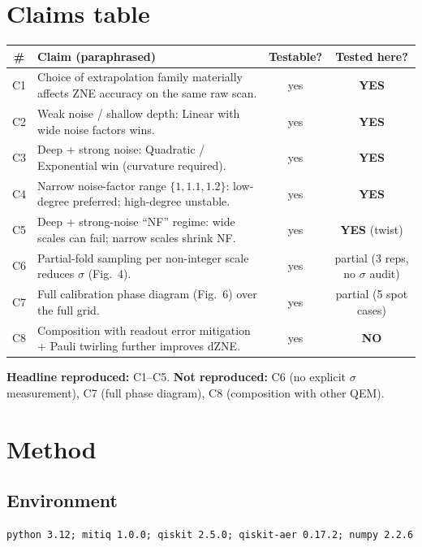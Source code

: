\documentclass[11pt]{article}
\begin{document}
\section{Claims table}
\begin{center}
\begin{tabular}{@{}clcc@{}}
\toprule
\# & Claim (paraphrased) & Testable? & Tested here? \\
\midrule
C1 & Choice of extrapolation family materially affects ZNE accuracy on the same raw scan. & yes & \textbf{YES} \\
C2 & Weak noise / shallow depth: Linear with wide noise factors wins. & yes & \textbf{YES} \\
C3 & Deep + strong noise: Quadratic / Exponential win (curvature required). & yes & \textbf{YES} \\
C4 & Narrow noise-factor range $\{1, 1.1, 1.2\}$: low-degree preferred; high-degree unstable. & yes & \textbf{YES} \\
C5 & Deep + strong-noise ``NF'' regime: wide scales can fail; narrow scales shrink NF. & yes & \textbf{YES} (twist) \\
C6 & Partial-fold sampling per non-integer scale reduces $\sigma$ (Fig.~4). & yes & partial (3 reps, no $\sigma$ audit) \\
C7 & Full calibration phase diagram (Fig.~6) over the full grid. & yes & partial (5 spot cases) \\
C8 & Composition with readout error mitigation + Pauli twirling further improves dZNE. & yes & \textbf{NO} \\
\bottomrule
\end{tabular}
\end{center}

\textbf{Headline reproduced:} C1--C5. \textbf{Not reproduced:} C6 (no explicit
$\sigma$ measurement), C7 (full phase diagram), C8 (composition with other QEM).

\section{Method}

\subsection{Environment}
\begin{lstlisting}
python 3.12; mitiq 1.0.0; qiskit 2.5.0; qiskit-aer 0.17.2; numpy 2.2.6
\end{lstlisting}
\end{document}
